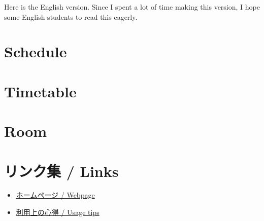 \documentclass[unicode,a4paper,11pt]{ltjsarticle}
\begin{document}
\clearpage

\setcounter{section}{0}

Here is the English version. Since I spent a lot of time making this version, I hope some English students to read this eagerly.

\label{eng_page}

\section{Schedule}





\section{Timetable}




\section{Room}




\clearpage

\section{リンク集 / Links}

\begin{itemize}
  \item
        \href{https://www.waseda.jp/inst/student/facility/seminar/facility/izukawana}{ホームページ / Webpage}
  \item
        \href{https://www.waseda.jp/inst/student/facility/seminar/flow/tips}{利用上の心得 / Usage tips}
\end{itemize}
\end{document}
